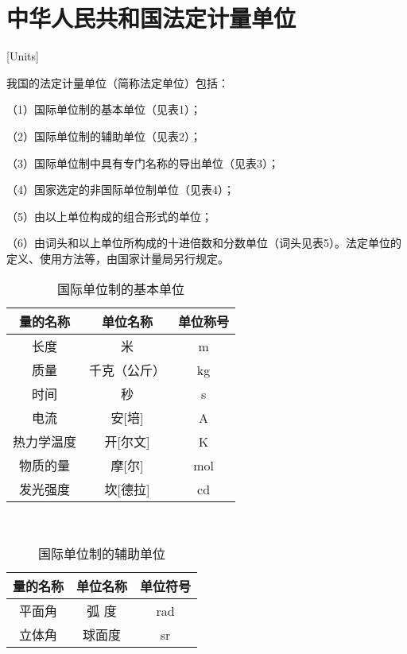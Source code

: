 \chapter{中华人民共和国法定计量单位}[Units]

我国的法定计量单位（简称法定单位）包括：

（1）国际单位制的基本单位（见表1）；

（2）国际单位制的辅助单位（见表2）；

（3）国际单位制中具有专门名称的导出单位（见表3）；

（4）国家选定的非国际单位制单位（见表4）；

（5）由以上单位构成的组合形式的单位；

（6）由词头和以上单位所构成的十进倍数和分数单位（词头见表5）。法定单位的定义、使用方法等，由国家计量局另行规定。 \hspace*{\fill} \\


\begin{table}[htbp]
    \centering
    \caption{国际单位制的基本单位}
    \begin{tabular}{ccc}
        \toprule
        量的名称   & 单位名称     & 单位称号 \\
        \midrule
        长度       & 米           & m        \\
        质量       & 千克（公斤） & kg       \\
        时间       & 秒           & s        \\
        电流       & 安[培]       & A        \\
        热力学温度 & 开[尔文]     & K        \\
        物质的量   & 摩[尔]       & mol      \\
        发光强度   & 坎[德拉]     & cd       \\
        \bottomrule
    \end{tabular}%
    \label{tab:tbl-b1}%
\end{table}%

\hspace*{\fill} \\


\begin{table}[htbp]
    \centering
    \caption{国际单位制的辅助单位}
    \begin{tabular}{ccc}
        \toprule
        量的名称 & 单位名称 & 单位符号 \\
        \midrule
        平面角   & 弧 度    & rad      \\
        立体角   & 球面度   & sr       \\
        \bottomrule
    \end{tabular}%
    \label{tab:tbl-b2}%
\end{table}%

